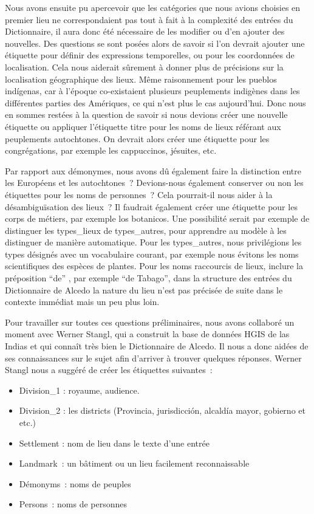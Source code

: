 \documentclass[a4paper,12pt,twoside]{book}
\begin{document}
Nous avons ensuite pu apercevoir que les catégories que nous avions choisies en premier lieu ne correspondaient pas tout à fait à la complexité des entrées du Dictionnaire, il aura donc été nécessaire de les modifier ou d’en ajouter des nouvelles. Des questions se sont posées alors de savoir si l’on devrait ajouter une étiquette pour définir des expressions temporelles, ou pour les coordonnées de localisation. Cela nous aiderait sûrement à donner plus de précisions sur la localisation géographique des lieux. Même raisonnement pour les pueblos indígenas, car à l’époque  co-existaient plusieurs peuplements indigènes dans les différentes parties des Amériques, ce qui n’est plus le cas aujourd’hui. Donc nous en sommes restées à la question de savoir si nous devions créer une nouvelle étiquette ou appliquer l’étiquette titre pour les noms de lieux référant aux peuplements autochtones. On devrait alors créer une étiquette pour les congrégations, par exemple les cappuccinos, jésuites, etc.

Par rapport aux démonymes, nous avons dû également faire la distinction entre les Européens et les autochtones ? Devions-nous également conserver ou non les étiquettes pour les noms de personnes ? Cela pourrait-il nous aider à la désambiguïsation des lieux ? Il faudrait également créer une étiquette pour les corps de métiers, par exemple los botanicos. Une possibilité serait par exemple de distinguer les types\_lieux de types\_autres, pour apprendre au modèle à les distinguer de manière automatique. Pour les types\_autres, nous privilégions les types désignés avec un vocabulaire courant, par exemple nous évitons les noms scientifiques des espèces de plantes. Pour les noms raccourcis de lieux, inclure la préposition “de” , par exemple “de Tabago”, dans la structure des entrées du Dictionnaire de Alcedo la nature du lieu n’est pas précisée de suite dans le contexte immédiat mais un peu plus loin.

Pour travailler sur toutes ces questions préliminaires, nous avons collaboré un moment avec Werner Stangl, qui a construit la base de données HGIS de las Indias et qui connaît très bien le Dictionnaire de Alcedo. Il nous a donc aidées de ses connaissances sur le sujet afin d’arriver à trouver quelques réponses. Werner Stangl nous a suggéré de créer les étiquettes suivantes : \\
	
	\begin{itemize}
    \item Division\_1 : royaume, audience.
    \item Division\_2 : les districts (Provincia, jurisdicción, alcaldía mayor, gobierno et etc.)
    \item Settlement : nom de lieu dans le texte d’une entrée
    \item Landmark : un bâtiment ou un lieu facilement reconnaissable
    \item Démonyms : noms de peuples
    \item Persons :  noms de personnes	\\
\end{itemize}	
\end{document}
